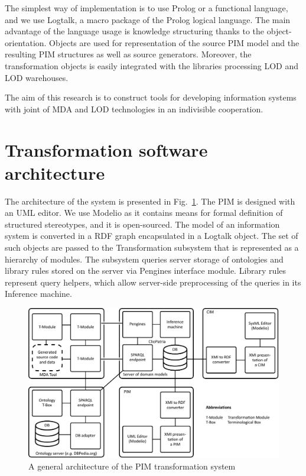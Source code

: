 \documentclass[runningheads]{llncs}
\begin{document}
The simplest way of implementation is to use Prolog or a functional language, and we use Logtalk, a macro package of the Prolog logical language.  The main advantage of the language usage is knowledge structuring thanks to the object-orientation.  Objects are used for representation of the source PIM model and the resulting PIM structures as well as source generators.  Moreover, the transformation objects is easily integrated with the libraries processing LOD and LOD warehouses.

The aim of this research is to construct tools for developing information systems with joint of MDA and LOD technologies in an indivisible cooperation.


\section{Transformation software architecture}
\label{sec:arch}

The architecture of the system is presented in Fig.~\ref{fig:arch}.  The PIM is designed with an UML editor.  We use Modelio \cite{modelio} as it contains means for formal definition of structured stereotypes, and it is open-sourced.  The model of an information system is converted in a RDF graph encapsulated in a Logtalk object.  The set of such objects are passed to the Transformation subsystem that is represented as a hierarchy of modules.  The subsystem queries server storage of ontologies and library rules stored on the server via Pengines interface module.  Library rules represent query helpers, which allow server-side preprocessing of the queries in its Inference machine.

\begin{figure}[t]
  \centering
  \includegraphics[width=1\linewidth]{architecture-mda-lod-ext.pdf}
  \caption{A general architecture of the PIM transformation system}
  \label{fig:arch}
\end{figure}
\end{document}
